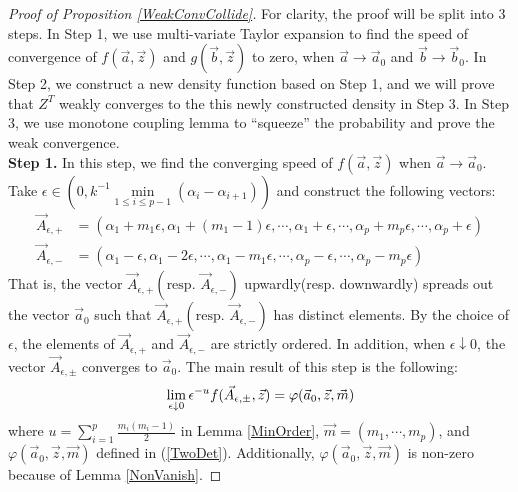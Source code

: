 \begin{proof}[Proof of Proposition \ref{WeakConvCollide}] For clarity, the proof will be split into $3$ steps. In Step 1, we use multi-variate Taylor expansion to find the speed of convergence of $f(\vec{a},\vec{z})$ and $g(\vec{b},\vec{z})$ to zero, when $\vec{a}\rightarrow\vec{a}_0$ and $\vec{b}\rightarrow\vec{b}_0$. In Step 2, we construct a new density function based on Step 1, and we will prove that $Z^{T}$ weakly converges to the this newly constructed density in Step 3. In Step 3, we use monotone coupling lemma to ``squeeze'' the probability and prove the weak convergence.\\
\textbf{Step 1. }In this step, we find the converging speed of $f(\vec{a},\vec{z})$ when $\vec{a}\rightarrow\vec{a}_0$. Take $\epsilon\in (0,k^{-1}\min\limits_{1\leq i\leq p-1}(\alpha_{i}-\alpha_{i+1}))$ and construct the following vectors:
\begin{align*}
	\vec{A}_{\epsilon,+}&=(\alpha_{1}+m_{1}\epsilon, \alpha_{1}+(m_{1}-1)\epsilon,\cdots,\alpha_{1}+\epsilon,\cdots,\alpha_{p}+m_{p}\epsilon,\cdots,\alpha_{p}+\epsilon)\\
	\vec{A}_{\epsilon,-}&=(\alpha_{1}-\epsilon, \alpha_{1}-2\epsilon,\cdots,\alpha_{1}-m_{1}\epsilon,\cdots,\alpha_{p}-\epsilon,\cdots,\alpha_{p}-m_{p}\epsilon)
\end{align*}
That is, the vector $\vec{A}_{\epsilon,+}(\text{resp. }\vec{A}_{\epsilon,-})$ upwardly(resp. downwardly) spreads out the vector $\vec{a}_{0}$ such that $\vec{A}_{\epsilon,+}(\text{resp. }\vec{A}_{\epsilon,-})$ has distinct elements. By the choice of $\epsilon$, the elements of $\vec{A}_{\epsilon,+}$ and $\vec{A}_{\epsilon,-}$ are strictly ordered. In addition, when $\epsilon\downarrow 0$, the vector $\vec{A}_{\epsilon,\pm}$ converges to $\vec{a}_{0}$. The main result of this step is the following:
\begin{align}{\label{ConvSpeedA}}
	\lim_{\epsilon\downarrow 0}\epsilon^{-u}f(\vec{A}_{\epsilon,\pm},\vec{z})=\varphi(\vec{a}_{0},\vec{z},\vec{m})
\end{align}
where $u=\sum_{i=1}^{p}\frac{m_{i}(m_{i}-1)}{2}$ in Lemma \ref{MinOrder}, $\vec{m}=(m_{1},\cdots,m_{p})$, and $\varphi(\vec{a}_{0},\vec{z},\vec{m})$ defined in (\ref{TwoDet}). Additionally, $\varphi(\vec{a}_{0},\vec{z},\vec{m})$ is non-zero because of Lemma \ref{NonVanish}.


\end{proof}
